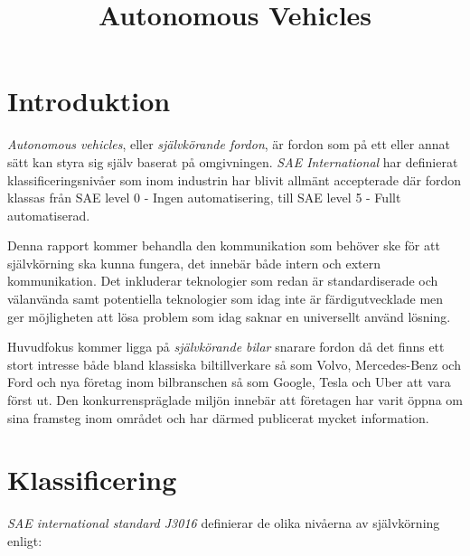 \documentclass[a4paper]{IEEEtran}
\title{Autonomous Vehicles}
\author{\IEEEauthorblockN{Niklas Hedström, Emil Wihlander\\ }
\IEEEauthorblockA{Lunds Tekniska Högskola\\
Lund, Sverige\\
Email: \{dat15ewi, dat15nhe\}@student.lu.se}}
\begin{document}
\maketitle

\begin{abstract}

\end{abstract}


\section{Introduktion}
\emph{Autonomous vehicles}, eller \emph{självkörande fordon}, är fordon som på ett eller annat sätt kan styra sig själv baserat på omgivningen. 
\emph{SAE International} har definierat klassificeringsnivåer som inom industrin har blivit allmänt accepterade där fordon klassas från SAE level 0 - Ingen automatisering, till SAE level 5 - Fullt automatiserad. \cite{SAE2014} 

Denna rapport kommer behandla den kommunikation som behöver ske för att självkörning ska kunna fungera, det innebär både intern och extern kommunikation. 
Det inkluderar teknologier som redan är standardiserade och välanvända samt potentiella teknologier som idag inte är färdigutvecklade men ger möjligheten att lösa problem som idag saknar en universellt använd lösning.

Huvudfokus kommer ligga på \emph{självkörande bilar} snarare fordon då det finns ett stort intresse både bland klassiska biltillverkare så som Volvo, Mercedes-Benz och Ford och nya företag inom bilbranschen så som Google, Tesla och Uber att vara först ut. 
Den konkurrenspräglade miljön innebär att företagen har varit öppna om sina framsteg inom området och har därmed publicerat mycket information. \cite{VolvoAD,MercedesAD,FordAD,GoogleAD,TeslaAD,UberAD}

\section{Klassificering}
\emph{SAE international standard J3016} definierar de olika nivåerna av självkörning enligt: \cite{SAE2014}
\end{document}
